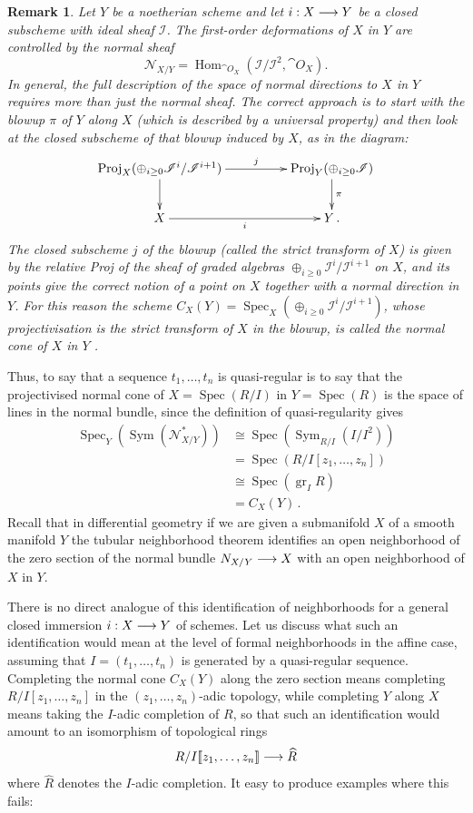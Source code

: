 \documentclass[english,letter paper,12pt,leqno]{article}
\theoremstyle{example}
\newtheorem{remark}[theorem]{Remark}
\numberwithin{equation}{section}
\def\Hom{\operatorname{Hom}}
\def\be{\begin{equation}}
\def\ee{\end{equation}}
\DeclareMathOperator{\Spec}{Spec}
\begin{document}
\begin{remark} Let $Y$ be a noetherian scheme and let $i: X \longrightarrow Y$ be a closed subscheme with ideal sheaf $\mathscr{I}$. The first-order deformations of $X$ in $Y$ are controlled \cite[Theorem VI-29]{eisenbudharris} by the normal sheaf
\[
\mathscr{N}_{X/Y} = \Hom_{\cat{O}_X}(\mathscr{I}/\mathscr{I}^2, \cat{O}_X).
\]
In general, the full description of the space of normal directions to $X$ in $Y$ requires more than just the normal sheaf. The correct approach is to start with the blowup $\pi$ of $Y$ along $X$ (which is described by a universal property) and then look at the closed subscheme of that blowup induced by $X$, as in the diagram:
\[
\xymatrix@C+2pc{
\operatorname{Proj}_X( \oplus_{i \ge 0} \mathscr{I}^i/\mathscr{I}^{i+1} ) \ar[r]^-j\ar[d] & \operatorname{Proj}_Y( \oplus_{i \ge 0} \mathscr{I} ) \ar[d]^-{\pi}\\
X \ar[r]_-{i} & Y\,.
}
\]
The closed subscheme $j$ of the blowup (called the strict transform of $X$) is given by the relative Proj of the sheaf of graded algebras $\oplus_{i \ge 0} \mathscr{I}^i/\mathscr{I}^{i+1}$ on $X$, and its points give the correct notion of a point on $X$ together with a normal direction in $Y$. For this reason the scheme $C_X(Y) = \Spec_X( \oplus_{i \ge 0} \mathscr{I}^i / \mathscr{I}^{i+1} )$, whose projectivisation is the strict transform of $X$ in the blowup, is called the \emph{normal cone} of $X$ in $Y$ \cite{fulton}.
\end{remark}

Thus, to say that a sequence $t_1,\ldots,t_n$ is quasi-regular is to say that the projectivised normal cone of $X = \Spec(R/I)$ in $Y = \Spec(R)$ is the space of lines in the normal bundle, since the definition of quasi-regularity gives 
\begin{align*}
\Spec_{Y}( \operatorname{Sym}( \mathscr{N}^*_{X/Y} ) ) &\cong \Spec( \operatorname{Sym}_{R/I}( I/I^2 ) )\\
&= \Spec( R/I[z_1,\ldots,z_n] )\\
&\cong \Spec( \operatorname{gr}_ I R)\\
&= C_X(Y)\,.
\end{align*}
Recall that in differential geometry if we are given a submanifold $X$ of a smooth manifold $Y$ the tubular neighborhood theorem \cite[\S 4.5]{hirsch} identifies an open neighborhood of the zero section of the normal bundle $N_{X/Y} \longrightarrow X$ with an open neighborhood of $X$ in $Y$. 

There is no direct analogue of this identification of neighborhoods for a general closed immersion $i: X \longrightarrow Y$ of schemes. Let us discuss what such an identification would mean at the level of formal neighborhoods in the affine case, assuming that $I = (t_1,\ldots,t_n)$ is generated by a quasi-regular sequence. Completing the normal cone $C_X(Y)$ along the zero section means completing $R/I[z_1,\ldots,z_n]$ in the $(z_1,\ldots,z_n)$-adic topology, while completing $Y$ along $X$ means taking the $I$-adic completion of $R$, so that such an identification would amount to an isomorphism of topological rings
\be\label{eq:formaltubular}
R/I\llbracket z_1,\ldots,z_n \rrbracket \lto \widehat{R}
\ee
where $\widehat{R}$ denotes the $I$-adic completion. It easy to produce examples where this fails:
\end{document}
